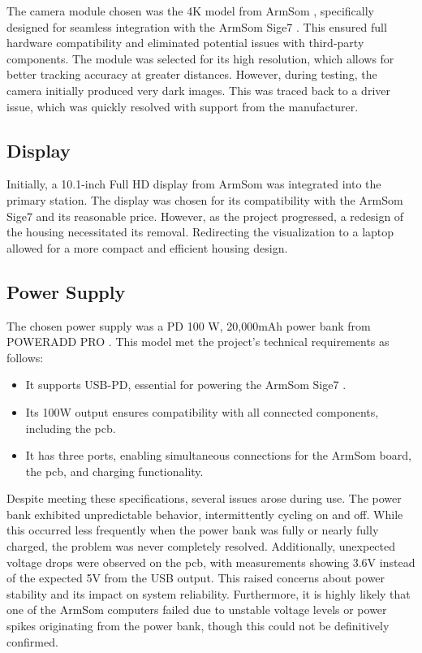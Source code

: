 The camera module chosen was the 4K model from ArmSom \cite{armsom_camera_module}, specifically designed for seamless integration with the ArmSom Sige7 \cite{armsom_sige7}. This ensured full hardware compatibility and eliminated potential issues with third-party components. The module was selected for its high resolution, which allows for better tracking accuracy at greater distances. However, during testing, the camera initially produced very dark images. This was traced back to a driver issue, which was quickly resolved with support from the manufacturer.

\subsection{Display}

Initially, a 10.1-inch Full HD display from ArmSom \cite{armsom_display} was integrated into the primary station. The display was chosen for its compatibility with the ArmSom Sige7 \cite{armsom_sige7} and its reasonable price. However, as the project progressed, a redesign of the housing necessitated its removal. Redirecting the visualization to a laptop allowed for a more compact and efficient housing design.

\subsection{Power Supply}

The chosen power supply was a PD 100 W, 20,000mAh power bank from POWERADD PRO \cite{poweradd_pro_powerbank}. This model met the project's technical requirements as follows:
\begin{itemize}
	\item It supports USB-PD, essential for powering the ArmSom Sige7 \cite{armsom_sige7}.
	\item Its 100W output ensures compatibility with all connected components, including the \acrshort{pcb}.
	\item It has three ports, enabling simultaneous connections for the ArmSom board, the \acrshort{pcb}, and charging functionality.
\end{itemize}

Despite meeting these specifications, several issues arose during use. The power bank exhibited unpredictable behavior, intermittently cycling on and off. While this occurred less frequently when the power bank was fully or nearly fully charged, the problem was never completely resolved. Additionally, unexpected voltage drops were observed on the \acrshort{pcb}, with measurements showing 3.6V instead of the expected 5V from the USB output. This raised concerns about power stability and its impact on system reliability. Furthermore, it is highly likely that one of the ArmSom computers failed due to unstable voltage levels or power spikes originating from the power bank, though this could not be definitively confirmed.

